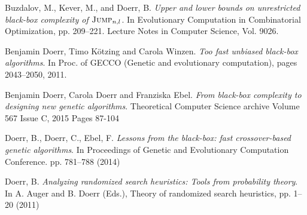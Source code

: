 \documentclass[specification,annotation,times]{itmo-student-thesis}
\begin{document}
\begin{thebibliography}{9}
 Buzdalov, M., Kever, M., and Doerr, B. \textit{Upper and lower bounds on unrestricted black-box complexity of $\textsc{Jump}_{n,l}$}. In Evolutionary Computation in Combinatorial Optimization, pp. 209--221. Lecture Notes in Computer Science, Vol. 9026.

 Benjamin Doerr, Timo Kötzing  and Carola Winzen. \textit{Too fast unbiased black-box algorithms}. In Proc. of GECCO (Genetic and evolutionary computation), pages 2043--2050, 2011.

 Benjamin Doerr, Carola Doerr and Franziska Ebel. \textit{From black-box complexity to designing new genetic algorithms}. Theoretical Computer Science archive Volume 567 Issue C, 2015 Pages 87-104

 Doerr, B., Doerr, C., Ebel, F. \textit{Lessons from the black-box: fast crossover-based genetic algorithms}. In Proceedings of Genetic and Evolutionary Computation Conference. pp. 781--788 (2014)

 Doerr, B.\textit{ Analyzing randomized search heuristics: Tools from probability theory}. In A. Auger and B. Doerr (Eds.), Theory of randomized search heuristics, pp. 1--20 (2011)

\end{thebibliography}
\end{document}
